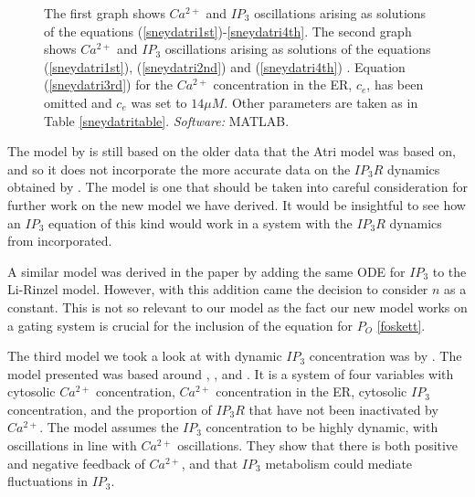\begin{figure}[!htb]
\endminipage\hfill
\caption{The first graph shows $Ca^{2+}$ and $IP_3$ oscillations arising as solutions of the equations (\ref{sneydatri1st})-\eqref{sneydatri4th}. The second graph shows $Ca^{2+}$ and $IP_3$ oscillations arising as solutions of the  equations (\ref{sneydatri1st}), (\ref{sneydatri2nd}) and (\ref{sneydatri4th}) \cite{sneyd}. Equation (\ref{sneydatri3rd}) for the $Ca^{2+}$ concentration in the ER, $c_e$, has been omitted and $c_e$  was set to $14 \mu M$. Other parameters are taken as in Table \ref{sneydatritable}. \textit{Software:} MATLAB.}\label{sneydatri2}
\end{figure}

{The model by  is still based on the older data  that the Atri model was based on, and so it does not incorporate the more accurate data on the $IP_3R$ dynamics obtained by . } The  model is one that should be taken into careful consideration for further work on the new model we have derived. It would be insightful to see how an $IP_3$ equation of this kind would work in a system with the $IP_3R$ dynamics from  incorporated. 

A similar model was derived in the paper by adding the same ODE for $IP_3$ to the Li-Rinzel model. However, with this addition came the decision to consider $n$ as a constant. This is not so relevant to our model as the fact our new model works on a gating system is crucial for the inclusion of the equation for $P_O$ \eqref{foskett}.

The third model we took a look at with dynamic $IP_3$ concentration was by . The model presented was based around , , and . It is a system of four variables with cytosolic $Ca^{2+}$ concentration, $Ca^{2+}$ concentration in the ER, cytosolic $IP_3$ concentration, and the proportion of $IP_3R$ that have not been inactivated by $Ca^{2+}$. The model assumes the $IP_3$ concentration to be highly dynamic, with oscillations in line with $Ca^{2+}$ oscillations. They show that there is both positive and negative feedback of $Ca^{2+}$, and that $IP_3$ metabolism could mediate fluctuations in $IP_3$.

